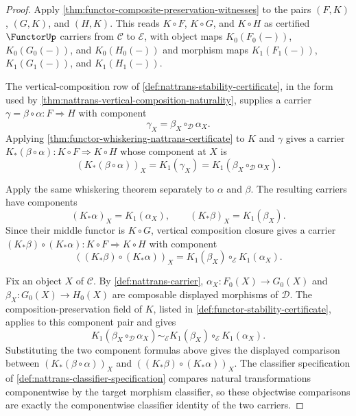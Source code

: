 \begin{proof}
Apply \autoref{thm:functor-composite-preservation-witnesses} to the pairs $(F,K)$, $(G,K)$, and $(H,K)$. This reads $K\circ F$, $K\circ G$, and $K\circ H$ as certified $\FunctorUp$ carriers from $\mathcal C$ to $\mathcal E$, with object maps $K_0(F_0(-))$, $K_0(G_0(-))$, and $K_0(H_0(-))$ and morphism maps $K_1(F_1(-))$, $K_1(G_1(-))$, and $K_1(H_1(-))$.

The vertical-composition row of \autoref{def:nattrans-stability-certificate}, in the form used by \autoref{thm:nattrans-vertical-composition-naturality}, supplies a carrier $\gamma=\beta\circ\alpha:F\Rightarrow H$ with component
$$
\gamma_X=\beta_X\circ_{\mathcal D}\alpha_X.
$$
Applying \autoref{thm:functor-whiskering-nattrans-certificate} to $K$ and $\gamma$ gives a carrier $K_{\ast}(\beta\circ\alpha):K\circ F\Rightarrow K\circ H$ whose component at $X$ is
$$
(K_{\ast}(\beta\circ\alpha))_X=K_1(\gamma_X)=K_1(\beta_X\circ_{\mathcal D}\alpha_X).
$$

Apply the same whiskering theorem separately to $\alpha$ and $\beta$. The resulting carriers have components
$$
(K_{\ast}\alpha)_X=K_1(\alpha_X),
\qquad
(K_{\ast}\beta)_X=K_1(\beta_X).
$$
Since their middle functor is $K\circ G$, vertical composition closure gives a carrier $(K_{\ast}\beta)\circ(K_{\ast}\alpha):K\circ F\Rightarrow K\circ H$ with component
$$
((K_{\ast}\beta)\circ(K_{\ast}\alpha))_X
=K_1(\beta_X)\circ_{\mathcal E}K_1(\alpha_X).
$$

Fix an object $X$ of $\mathcal C$. By \autoref{def:nattrans-carrier}, $\alpha_X:F_0(X)\to G_0(X)$ and $\beta_X:G_0(X)\to H_0(X)$ are composable displayed morphisms of $\mathcal D$. The composition-preservation field of $K$, listed in \autoref{def:functor-stability-certificate}, applies to this component pair and gives
$$
K_1(\beta_X\circ_{\mathcal D}\alpha_X)
\sim_{\mathcal E}
K_1(\beta_X)\circ_{\mathcal E}K_1(\alpha_X).
$$
Substituting the two component formulas above gives the displayed comparison between $(K_{\ast}(\beta\circ\alpha))_X$ and $((K_{\ast}\beta)\circ(K_{\ast}\alpha))_X$. The classifier specification of \autoref{def:nattrans-classifier-specification} compares natural transformations componentwise by the target morphism classifier, so these objectwise comparisons are exactly the componentwise classifier identity of the two carriers.
\end{proof}

